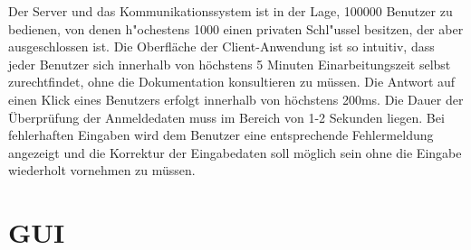 \documentclass[a4paper,10pt]{scrartcl}
\begin{document}
\begin{usecase}
 {Der Server und das Kommunikationssystem ist in der Lage,
                100000 Benutzer zu bedienen, von denen h"ochestens 1000 einen
                privaten Schl"ussel besitzen, der aber ausgeschlossen ist.}
 {Die Oberfläche der Client-Anwendung ist so intuitiv, dass jeder Benutzer
                sich innerhalb von höchstens 5 Minuten Einarbeitungszeit selbst
                zurechtfindet, ohne die Dokumentation konsultieren zu müssen.}
 {Die Antwort auf einen Klick eines Benutzers erfolgt innerhalb von
                höchstens 200ms.}
 {Die Dauer der Überprüfung der Anmeldedaten muss im Bereich von 
                1-2 Sekunden liegen.}
 {Bei fehlerhaften Eingaben wird dem Benutzer eine entsprechende 
                Fehlermeldung angezeigt und die Korrektur der Eingabedaten soll möglich sein
								ohne die Eingabe wiederholt vornehmen zu müssen.}								
\end{usecase}

\section{GUI}
\end{document}
